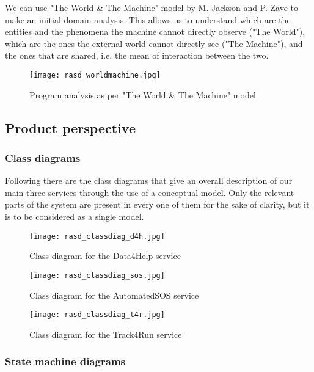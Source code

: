 \documentclass[../main.tex]{subfiles}
\begin{document}
We can use "The World \& The Machine" model by M. Jackson and P. Zave to make an initial domain analysis. This allows us to understand which are the entities and the phenomena the machine cannot directly observe ("The World"), which are the ones the external world cannot directly see ("The Machine"), and the ones that are shared, i.e. the mean of interaction between the two.

\begin{figure}[h!]
	\texttt{[image: rasd\_worldmachine.jpg]}
	\caption{Program analysis as per "The World \& The Machine" model}
	\label{fig:rasd_worldmachine}
\end{figure}

\subsection{Product perspective}

\subsubsection{Class diagrams}

Following there are the class diagrams that give an overall description of our main three services through the use of a conceptual model. Only the relevant parts of the system are present in every one of them for the sake of clarity, but it is to be considered as a single model.
\newpage
\thispagestyle{empty} %
\begin{figure}[H]
	\texttt{[image: rasd\_classdiag\_d4h.jpg]}
	\caption{Class diagram for the Data4Help service}
	\label{fig:classdiag_d4h}
\end{figure}
\newpage
\thispagestyle{empty}
\begin{figure}[H]
	\texttt{[image: rasd\_classdiag\_sos.jpg]}
	\caption{Class diagram for the AutomatedSOS service}
	\label{fig:classdiag_sos}
\end{figure}
\newpage
\thispagestyle{empty}
\begin{figure}[H]
	\texttt{[image: rasd\_classdiag\_t4r.jpg]}
	\caption{Class diagram for the Track4Run service}
	\label{fig:classdiag_t4r}
\end{figure}
\newpage

\subsubsection{State machine diagrams}
\end{document}
